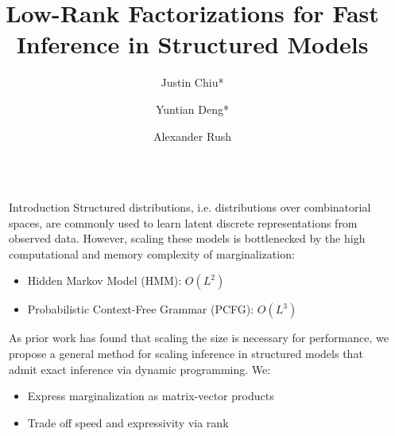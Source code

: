 \documentclass{beamer}
\title{Low-Rank Factorizations for Fast Inference in Structured Models}
\author{Justin Chiu* \inst{1} \and Yuntian Deng* \inst{2} \and Alexander Rush \inst{1}}
\institute[shortinst]{\inst{1} Cornell Tech and \inst{2} Harvard University}
\newlength{\sepwid}
\newlength{\onecolwid}
\begin{document}

\setlength{\belowcaptionskip}{2ex} %
\setlength\belowdisplayshortskip{2ex} %

\begin{frame}


\begin{columns}[t] %

\begin{column}{\sepwid}\end{column} %

\begin{column}{\onecolwid} %


\begin{block}{Introduction}
Structured distributions, i.e. distributions over combinatorial spaces,
are commonly used to learn latent discrete representations from observed data.
However, scaling these models is bottlenecked by the high computational and memory complexity
of marginalization:
\begin{itemize}
\item Hidden Markov Model (HMM): $O(L^2)$
\item Probabilistic Context-Free Grammar (PCFG): $O(L^3)$
\end{itemize}
As prior work has found that scaling the size is necessary for performance,
we propose a general method for scaling inference in structured models that admit
exact inference via dynamic programming.
We:
\begin{itemize}
\item Express marginalization as matrix-vector products
\item Trade off speed and expressivity via rank
\end{itemize}
\end{block}



\end{column}
\end{columns}
\end{frame}
\end{document}

